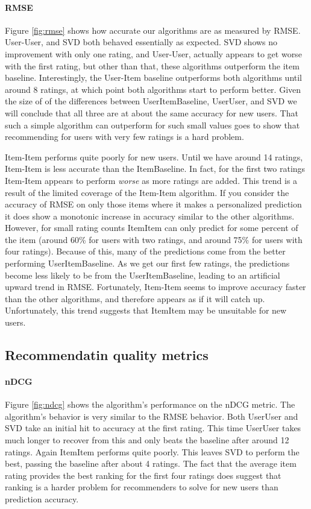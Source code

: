 \documentclass[letterpaper]{sig-alternate}
\begin{document}
  \paragraph{RMSE}
  Figure \ref{fig:rmse} shows how accurate our algorithms are as measured by RMSE.
  User-User, and SVD both behaved essentially as expected.
  SVD shows no improvement with only one rating, and User-User, actually appears to get worse with the first rating, but other than that, these algorithms outperform the item baseline.
  Interestingly, the User-Item baseline outperforms both algorithms until around 8 ratings, at which point both algorithms start to perform better.
  Given the size of of the differences between UserItemBaseline, UserUser, and SVD we will conclude that all three are at about the same accuracy for new users.
  That such a simple algorithm can outperform for such small values goes to show that recommending for users with very few ratings is a hard problem.
  
  Item-Item performs quite poorly for new users.
  Until we have around 14 ratings, Item-Item is less accurate than the ItemBaseline.
  In fact, for the first two ratings Item-Item appears to perform \emph{worse} as more ratings are added.
  This trend is a result of the limited coverage of the Item-Item algorithm.
  If you consider the accuracy of RMSE on only those items where it makes a personalized prediction it does show a monotonic increase in accuracy similar to the other algorithms.
  However, for small rating counts ItemItem can only predict for some percent of the item (around 60\% for users with two ratings, and around 75\% for users with four ratings).
  Because of this, many of the predictions come from the better performing UserItemBaseline.
  As we get our first few ratings, the predictions become less likely to be from the UserItemBaseline, leading to an artificial upward trend in RMSE.
  Fortunately, Item-Item seems to improve accuracy faster than the other algorithms, and therefore appears as if it will catch up.
  Unfortunately, this trend suggests that ItemItem may be unsuitable for new users.

\subsection {Recommendatin quality metrics}
  \paragraph{nDCG}
  Figure \ref{fig:ndcg} shows the algorithm's performance on the nDCG metric.
  The algorithm's behavior is very similar to the RMSE behavior.
  Both UserUser and SVD take an initial hit to accuracy at the first rating.
  This time UserUser takes much longer to recover from this and only beats the baseline after around 12 ratings.
  Again ItemItem performs quite poorly.
  This leaves SVD to perform the best, passing the baseline after about 4 ratings.
  The fact that the average item rating provides the best ranking for the first four ratings does suggest that ranking is a harder problem for recommenders to solve for new users than prediction accuracy.
  
\end{document}
